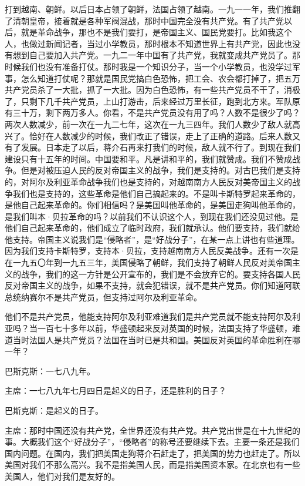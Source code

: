 打到越南、朝鲜。以后日本占领了朝鲜，法国占领了越南。一九一一年，我们推翻了清朝皇帝，接着就是各种军阀混战，那时中国完全没有共产党。有了共产党以后，就是革命战争，那也不是我们要打，是帝国主义、国民党要打。比如我这个人，也做过新闻记者，当过小学教员，那时根本不知道世界上有共产党，因此也没有想到自己要加入共产党。一九二一年中国有了共产党，我就变成共产党员了。那时候我们也没有准备打仗。那时我是一个知识分子，当一个小学教员，也没学过军事，怎么知道打仗呢？那就是国民党搞白色恐怖，把工会、农会都打掉了，把五万共产党员杀了一大批，抓了一大批。因为白色恐怖，有一些共产党员不干了，消极了，只剩下几千共产党员，上山打游击，后来经过万里长征，跑到北方来。军队原有三十万，剩下两万多人。你看，不是共产党员没有用了吗？人数不是很少了吗？两次人数减少，前一次在一九二七年，这次在一九三四年。我们人数少了敌人就高兴了。恰好在人数减少的时候，我们改正了错误，走上了正确的道路。后来人数又有了发展。日本走了以后，蒋介石再来打我们的时候，敌人就不行了。到现在我们建设只有十五年的时间。中国要和平。凡是讲和平的，我们就赞成。我们不赞成战争。但是对被压迫人民的反对帝国主义的战争，我们是支持的。对古巴我们是支持的，对阿尔及利亚革命战争我们也是支持的，对越南南方人民反对美帝国主义的战争我们也是支持的，这些革命是他们自己搞起来的。不是叫卡斯特罗起来革命的，是他自己起来革命的。你们相信吗？是美国叫他革命的，是美国走狗叫他革命的，是我们叫本·贝拉革命的吗？以前我们不认识这个人，到现在我们还没见过他。是他们自己起来革命的，他们成立了临时政府，我们就承认。他们要支持，我们就给他支持。帝国主义说我们是“侵略者”，是“好战分子”，在某一点上讲也有些道理。因为我们支持卡斯特罗，支持本·贝拉，支持越南南方人民反美战争。还有一次是在一九五〇年到一九五三年，美国侵略了朝鲜，我们支持了朝鲜人民反对美帝国主义的战争，我们的这一方针是公开宣布的，我们是不会放弃它的。要支持各国人民反对帝国主义的战争，如果不支持，就会犯错误，就不是共产党员。你们知道阿联总统纳赛尔不是共产党员，但支持过阿尔及利亚革命。

他们不是共产党员，他能支持阿尔及利亚难道我们是共产党员就不能支持阿尔及利亚吗？当一百七十多年以前，华盛顿起来反对英国的时候，法国支持了华盛顿，难道当时法国人是共产党员？法国在当时已是共和国。美国反对英国的革命胜利在哪一年？

巴斯克斯：一七八九年。

主席：一七八九年七月四日是起义的日子，还是胜利的日子？

巴斯克斯：是起义的日子。

主席：那时中国还没有共产党，全世界还没有共产党。共产党出世是在十九世纪的事。大概我们这个“好战分子”，“侵略者”的称号还要继续下去。主要一条还是我们国内问题。在国内，我们把美国走狗蒋介石赶走了，把美国的势力也赶走了。所以美国对我们不那么高兴。我不是指美国人民，而是指美国资本家。在北京也有一些美国人，他们对我们是友好的。

